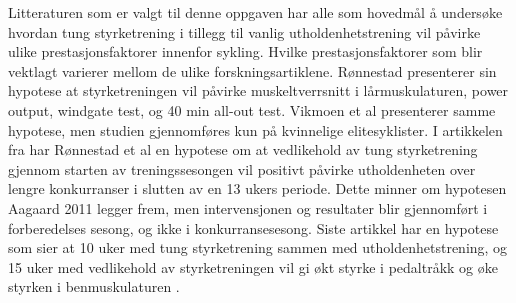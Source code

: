 \documentclass[
]{book}
\begin{document}
Litteraturen som er valgt til denne oppgaven har alle som hovedmål å undersøke hvordan tung styrketrening i tillegg til vanlig utholdenhetstrening vil påvirke ulike prestasjonsfaktorer innenfor sykling. Hvilke prestasjonsfaktorer som blir vektlagt varierer mellom de ulike forskningsartiklene. Rønnestad \citep{rønnestad2010b} presenterer sin hypotese at styrketreningen vil påvirke muskeltverrsnitt i lårmuskulaturen, power output, windgate test, og 40 min all-out test. Vikmoen et al \citep{vikmoen2016} presenterer samme hypotese, men studien gjennomføres kun på kvinnelige elitesyklister. I artikkelen fra \citep{rønnestad2010a} har Rønnestad et al en hypotese om at vedlikehold av tung styrketrening gjennom starten av treningssesongen vil positivt påvirke utholdenheten over lengre konkurranser i slutten av en 13 ukers periode. Dette minner om hypotesen Aagaard 2011 legger frem, men intervensjonen og resultater blir gjennomført i forberedelses sesong, og ikke i konkurransesesong. Siste artikkel har en hypotese som sier at 10 uker med tung styrketrening sammen med utholdenhetstrening, og 15 uker med vedlikehold av styrketreningen vil gi økt styrke i pedaltråkk og øke styrken i benmuskulaturen \citep{rønnestad2015}.
\end{document}
